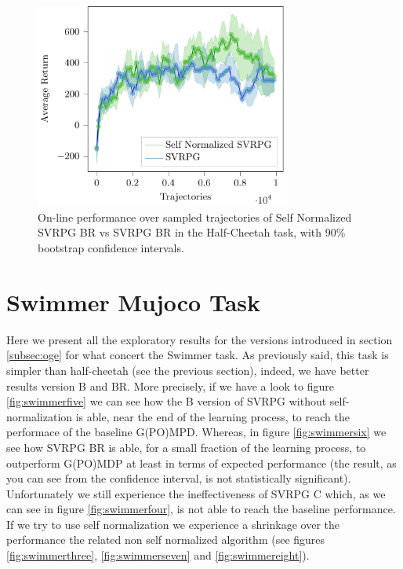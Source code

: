 \begin{figure}[h]
	\begin{minipage}[h]{1\textwidth}
		\centering
		\includegraphics[width=0.75\textwidth]{Images/Experiments/half_cheetah_SVRPG_vs_SN_SVRPG_B_reuse.pdf}
		\vspace{-0.1in}
		\caption{On-line performance over sampled trajectories of Self Normalized \acs{SVRPG} BR vs \acs{SVRPG} BR in the Half-Cheetah task, with 90\% bootstrap confidence intervals.}
		\label{fig:hceleven}
	\end{minipage}
	\vspace{-0.15in}
\end{figure}

\clearpage
\section{Swimmer Mujoco Task}
\vspace{-0.05in}
Here we present all the exploratory results for the versions introduced in section \ref{subsec:oge} for what concert the Swimmer task. As previously said, this task is simpler than half-cheetah (see the previous section), indeed, we have better results \wrt version B and BR. More precisely, if we have a look to figure \ref{fig:swimmerfive} we can see how the B version of \acs{SVRPG} without self-normalization is able, near the end of the learning process, to reach the performace of the baseline G(PO)MPD. Whereas, in figure \ref{fig:swimmersix} we see how \acs{SVRPG} BR is able, for a small fraction of the learning process, to outperform G(PO)MDP at least in terms of expected performance (the result, as you can see from the confidence interval, is not statistically significant). Unfortunately we still experience the ineffectiveness of \acs{SVRPG} C which, as we can see in figure \ref{fig:swimmerfour}, is not able to reach the baseline performance. If we try to use self normalization we experience a shrinkage over the performance \wrt the related non self normalized algorithm (see figures \ref{fig:swimmerthree}, \ref{fig:swimmerseven} and \ref{fig:swimmereight}).

